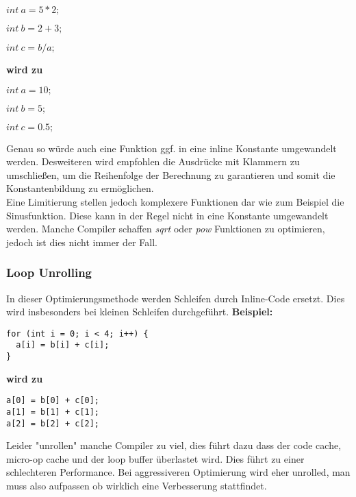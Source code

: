 \documentclass{article}
\begin{document}
\begin{math}
int\ a = 5 * 2;
\end{math}

\begin{math}
int\ b = 2+3;
\end{math}

\begin{math}
int\ c = b / a;
\end{math}

\textbf{wird zu} 

\begin{math}
int\ a = 10;
\end{math}

\begin{math}
int\ b = 5;
\end{math}

\begin{math}
int\ c = 0.5;
\end{math}

Genau so würde auch eine Funktion ggf. in eine inline Konstante umgewandelt werden. Desweiteren wird empfohlen die Ausdrücke mit Klammern zu umschließen, um die Reihenfolge der Berechnung zu garantieren und somit die Konstantenbildung zu ermöglichen. \\
Eine Limitierung stellen jedoch komplexere Funktionen dar wie zum Beispiel die Sinusfunktion. Diese kann in der Regel nicht in eine Konstante umgewandelt werden. Manche Compiler schaffen \emph{sqrt} oder \emph{pow} Funktionen zu optimieren, jedoch ist dies nicht immer der Fall. 

\subsubsection{Loop Unrolling}
In dieser Optimierungsmethode werden Schleifen durch Inline-Code ersetzt. Dies wird insbesonders bei kleinen Schleifen durchgeführt. 
\textbf{Beispiel:}
\begin{verbatim}
for (int i = 0; i < 4; i++) {
  a[i] = b[i] + c[i];
}
\end{verbatim}
\textbf{wird zu}
\begin{verbatim}
a[0] = b[0] + c[0];
a[1] = b[1] + c[1];
a[2] = b[2] + c[2];
\end{verbatim}

Leider "unrollen" manche Compiler zu viel, dies führt dazu dass der code cache, micro-op cache und der loop buffer überlastet wird. Dies führt zu einer schlechteren Performance. Bei aggressiveren Optimierung wird eher unrolled, man muss also aufpassen ob wirklich eine Verbesserung stattfindet.
\end{document}
